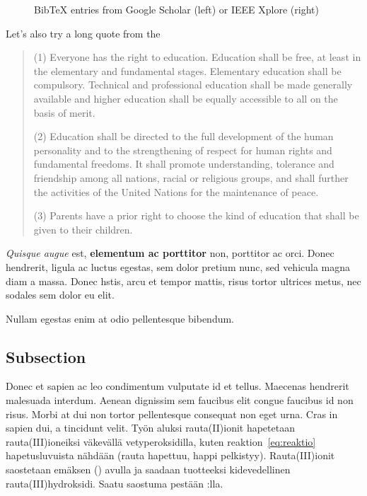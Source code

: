 \begin{figure}[ht]
  \centering
  \caption{BibTeX entries from Google Scholar (left) or IEEE Xplore (right)}
  \label{fig:bibtex}
\end{figure}

Let's also try a long quote from the 
\begin{quote}
(1) Everyone has the right to education. Education shall be free, at least in the elementary and fundamental stages. Elementary education shall be compulsory. Technical and professional education shall be made generally available and higher education shall be equally accessible to all on the basis of merit.

(2) Education shall be directed to the full development of the human personality and to the strengthening of respect for human rights and fundamental freedoms. It shall promote understanding, tolerance and friendship among all nations, racial or religious groups, and shall further the activities of the United Nations for the maintenance of peace.

(3) Parents have a prior right to choose the kind of education that shall be given to their children. \cite[article 26]{un:udhr}
\end{quote}

\textit{Quisque augue} est, \textbf{elementum ac porttitor} non, porttitor ac orci. Donec hendrerit, ligula ac luctus egestas, sem dolor pretium nunc, sed vehicula magna diam a massa. Donec hstis, arcu et tempor mattis, risus tortor ultrices metus, nec sodales sem dolor eu elit.

Nullam egestas enim at odio pellentesque bibendum.

\subsection{Subsection}
Donec et sapien ac leo condimentum vulputate id et tellus. Maecenas hendrerit malesuada interdum. Aenean dignissim sem faucibus elit congue faucibus id non risus. Morbi at dui non tortor pellentesque consequat non eget urna. Cras in sapien dui, a tincidunt velit.
Työn aluksi rauta(II)ionit hapetetaan rauta(III)ioneiksi väkevällä vetyperoksidilla, kuten reaktion~\ref{eq:reaktio} hapetusluvuista nähdään (rauta hapettuu, happi pelkistyy).
Rauta(III)ionit saostetaan emäksen () avulla ja saadaan tuotteeksi kidevedellinen rauta(III)hydroksidi. Saatu saostuma pestään :lla.

